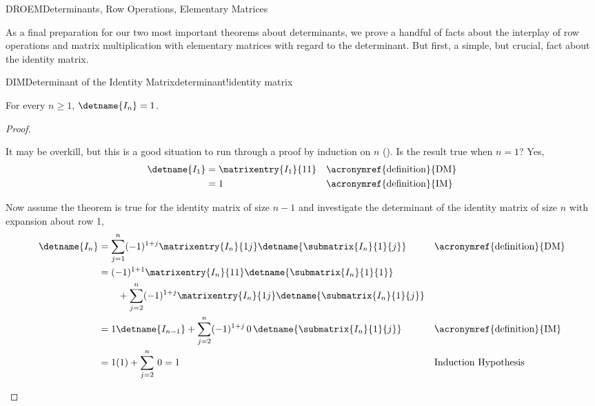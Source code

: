 %
\begin{subsect}{DROEM}{Determinants, Row Operations, Elementary Matrices}
%
\begin{para}As a final preparation for our two most important theorems about determinants, we prove a handful of facts about the interplay of row operations and matrix multiplication with elementary matrices with regard to the determinant.  But first, a simple, but crucial, fact about the identity matrix.\end{para}
%
%
\begin{theorem}{DIM}{Determinant of the Identity Matrix}{determinant!identity matrix}
\begin{para}For every $n\geq 1$, $\detname{I_n}=1$.\end{para}
\end{theorem}
%
\begin{proof}
\begin{para}It may be overkill, but this is a good situation to run through a proof by induction on $n$ ().  Is the result true when $n=1$? Yes,
%
\begin{align*}
\detname{I_1}
&=\matrixentry{I_1}{11}&&\text{\acronymref{definition}{DM}}\\
%
&=1&&\text{\acronymref{definition}{IM}}\\
%
\end{align*}
\end{para}
%
\begin{para}Now assume the theorem is true for the identity matrix of size $n-1$ and investigate the determinant of the identity matrix of size $n$ with expansion about row 1,
%
\begin{align*}
\detname{I_n}
&=
\sum_{j=1}^{n}(-1)^{1+j}\matrixentry{I_n}{1j}\detname{\submatrix{I_n}{1}{j}}
&&\text{\acronymref{definition}{DM}}\\
%
&=
(-1)^{1+1}\matrixentry{I_n}{11}\detname{\submatrix{I_n}{1}{1}}\\
&\quad\quad+
\sum_{j=2}^{n}(-1)^{1+j}\matrixentry{I_n}{1j}\detname{\submatrix{I_n}{1}{j}}\\
%
&=
1\detname{I_{n-1}}+
\sum_{j=2}^{n}(-1)^{1+j}\,0\,\detname{\submatrix{I_n}{1}{j}}
&&\text{\acronymref{definition}{IM}}\\
%
&=
1(1)+\sum_{j=2}^{n}\,0=1
&&\text{Induction Hypothesis}\\
\end{align*}
\end{para}
%
\end{proof}

\end{subsect}
